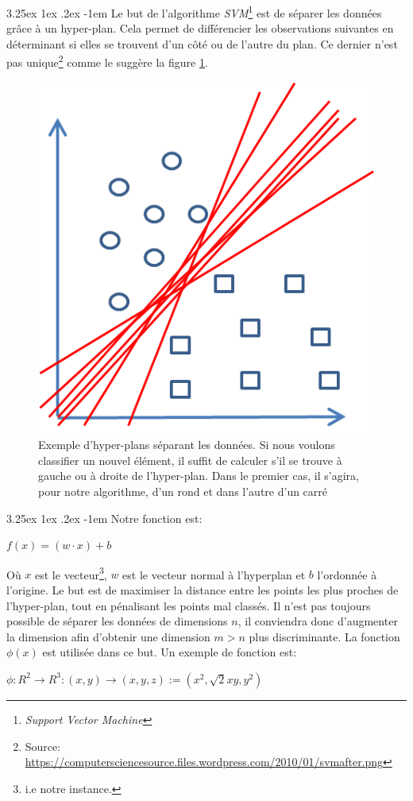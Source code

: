 \documentclass[a4paper, 11pt]{article}
\makeatletter
\renewcommand\paragraph{\@startsection{paragraph}{5}{\z@}%
  {3.25ex \@plus1ex \@minus.2ex}%
  {-1em}%
  {\normalfont\normalsize\bfseries}}
\makeatother
\begin{document}
\paragraph{}
Le but de l'algorithme \textit{SVM}\footnote{\textit{Support Vector Machine}} est de séparer les données grâce à un hyper-plan.
Cela permet de différencier les observations suivantes en déterminant si elles se trouvent d'un côté ou de l'autre 
du plan. Ce dernier n'est pas unique\footnote{Source: \url{https://computersciencesource.files.wordpress.com/2010/01/svmafter.png}} comme le suggère la figure \ref{svm_exemple}. 
\begin{figure}[H]
\centering
\includegraphics{images/svm_exemple}
\caption{Exemple d'hyper-plans séparant les données. Si nous voulons classifier un nouvel élément, 
il suffit de calculer s'il se trouve à gauche ou à droite de l'hyper-plan. Dans le premier cas, il s'agira, 
pour notre algorithme, d'un rond et dans l'autre d'un carré}
\label{svm_exemple}
\end{figure}

\paragraph{}
Notre fonction est:
\begin{center}
$f(x) = (w \cdot x) + b$
\end{center}
Où $x$ est le vecteur\footnote{i.e notre instance.}, $w$ est le vecteur normal à l'hyperplan et $b$ l'ordonnée à l'origine.
Le but est de maximiser la distance entre les points les plus proches de l'hyper-plan, tout en pénalisant 
les points mal classés. Il n'est pas toujours possible de séparer les données de dimensions $n$, 
il conviendra donc d'augmenter la dimension afin d'obtenir une dimension $m > n$ plus discriminante. 
La fonction $\phi(x)$ est utilisée dans ce but. Un exemple de fonction est:
\begin{center}
$\phi: R^2 \rightarrow R^3 :(x, y) \rightarrow (x, y, z):= (x^2, \sqrt{2}x y, y^2)$
\end{center}
\end{document}

